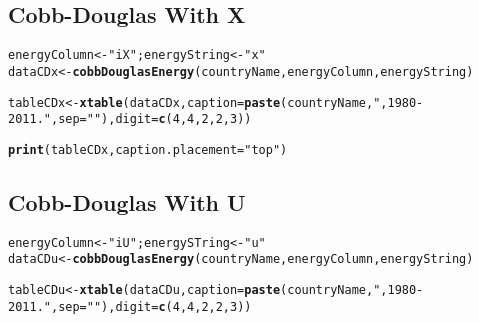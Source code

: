 \documentclass[preprint,authoryear,12pt]{elsarticle}\usepackage{graphicx, color}
\makeatletter
\newcommand{\hlfunctioncall}[1]{\textcolor[rgb]{0.501960784313725,0,0.329411764705882}{\textbf{#1}}}%
\newcommand{\hlstring}[1]{\textcolor[rgb]{0.6,0.6,1}{#1}}%
\newenvironment{kframe}{%
 \def\at@end@of@kframe{}%
 \ifinner\ifhmode%
  \def\at@end@of@kframe{\end{minipage}}%
  \begin{minipage}{\columnwidth}%
 \fi\fi%
 \def\FrameCommand##1{\hskip\@totalleftmargin \hskip-\fboxsep
 \colorbox{shadecolor}{##1}\hskip-\fboxsep
     \hskip-\linewidth \hskip-\@totalleftmargin \hskip\columnwidth}%
 \MakeFramed {\advance\hsize-\width
   \@totalleftmargin\z@ \linewidth\hsize
   \@setminipage}}%
 {\par\unskip\endMakeFramed%
 \at@end@of@kframe}
\newenvironment{knitrout}{}{} %
\makeatother
\begin{document}
\subsection{Cobb-Douglas With X}

\begin{knitrout}
\color{fgcolor}\begin{kframe}
\begin{alltt}
energyColumn <- \hlstring{"iX"}; energyString <- \hlstring{"x"}
dataCDx <- \hlfunctioncall{cobbDouglasEnergy}(countryName, energyColumn, energyString)
\end{alltt}


{\ttfamily\noindent\bfseries\color{errorcolor}{Error: could not find function "cobbDouglasEnergy"}}\begin{alltt}
tableCDx <- \hlfunctioncall{xtable}(dataCDx, caption=\hlfunctioncall{paste}(countryName, \hlstring{", 1980-2011."}, sep=\hlstring{""}), digit = \hlfunctioncall{c}(4, 4, 2, 2, 3))
\end{alltt}


{\ttfamily\noindent\bfseries\color{errorcolor}{Error: object 'dataCDx' not found}}\end{kframe}
\end{knitrout}


\begin{kframe}
\begin{alltt}
\hlfunctioncall{print}(tableCDx, caption.placement=\hlstring{"top"})
\end{alltt}


{\ttfamily\noindent\bfseries\color{errorcolor}{Error: error in evaluating the argument 'x' in selecting a method for function 'print': Error: object 'tableCDx' not found}}\end{kframe}


\subsection{Cobb-Douglas With U}

\begin{knitrout}
\color{fgcolor}\begin{kframe}
\begin{alltt}
energyColumn <- \hlstring{"iU"}; energySTring <- \hlstring{"u"}
dataCDu <- \hlfunctioncall{cobbDouglasEnergy}(countryName, energyColumn, energyString)
\end{alltt}


{\ttfamily\noindent\bfseries\color{errorcolor}{Error: could not find function "cobbDouglasEnergy"}}\begin{alltt}
tableCDu <- \hlfunctioncall{xtable}(dataCDu, caption=\hlfunctioncall{paste}(countryName, \hlstring{", 1980-2011."}, sep=\hlstring{""}), digit = \hlfunctioncall{c}(4, 4, 2, 2, 3))
\end{alltt}


{\ttfamily\noindent\bfseries\color{errorcolor}{Error: object 'dataCDu' not found}}\end{kframe}
\end{knitrout}
\end{document}
